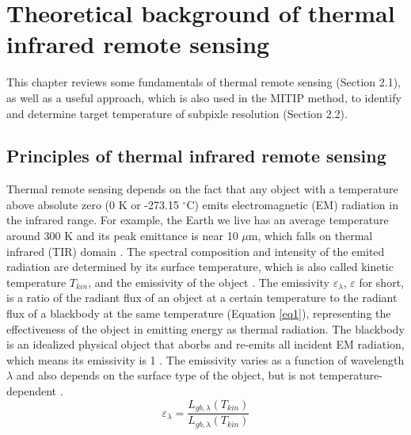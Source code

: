 \chapter{Theoretical background of thermal infrared remote sensing}

\label{Chapter2}

This chapter reviews some fundamentals of thermal remote sensing (Section 2.1), as well as a useful approach, which is also used in the MITIP method, to identify and determine target temperature of subpixle resolution (Section 2.2). \\


\section{Principles of thermal infrared remote sensing}
Thermal remote sensing depends on the fact that any object with a temperature above absolute zero (0 K or -273.15 $^\circ$C) emits electromagnetic (EM) radiation in the infrared range. For example, the Earth we live has an average temperature around 300 K and its peak emittance is near 10 $\mu$m, which falls on thermal infrared (TIR) domain \parencite {Reference201, Reference202}. The spectral composition and intensity of the emited radiation are determined by its surface temperature, which is also called kinetic temperature $T_{kin}$,  and the emissivity of the object \parencite{Reference207}. The emissivity $\varepsilon_{\lambda}$, $\varepsilon$ for short, is a ratio of the radiant flux of an object at a certain temperature to the radiant flux of a blackbody at the same temperature (Equation \eqref{eq1}), representing the effectiveness of the object in emitting energy as thermal radiation. The blackbody is an idealized physical object that aborbs and re-emits all incident EM radiation, which means its emissivity is 1 \parencite{Reference206, Reference204}. The emissivity varies as a function of wavelength $\lambda$ and also depends on the surface type of the object, but is not temperature-dependent \parencite{Reference203}.\\
\begin{equation}
\label{eq1}
\varepsilon_{\lambda} = \frac{L_{gb, \lambda}(T_{kin})}{L_{gb, \lambda}(T_{kin})}
\end{equation}

